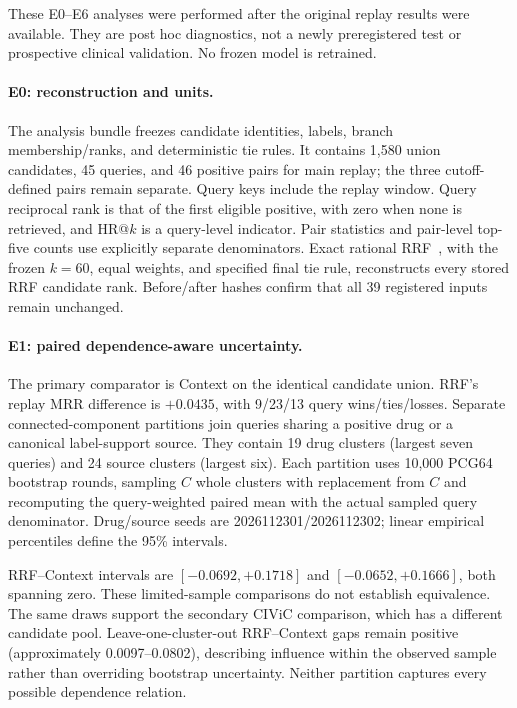 \documentclass[runningheads]{llncs}
\begin{document}
These E0--E6 analyses were performed after the original replay results were available. They are post hoc diagnostics, not a newly preregistered test or prospective clinical validation. No frozen model is retrained.

\paragraph{E0: reconstruction and units.}
The analysis bundle freezes candidate identities, labels, branch membership/ranks, and deterministic tie rules. It contains 1,580 union candidates, 45 queries, and 46 positive pairs for main replay; the three cutoff-defined pairs remain separate. Query keys include the replay window. Query reciprocal rank is that of the first eligible positive, with zero when none is retrieved, and HR@\(k\) is a query-level indicator. Pair statistics and pair-level top-five counts use explicitly separate denominators. Exact rational RRF~\cite{rrf}, with the frozen \(k=60\), equal weights, and specified final tie rule, reconstructs every stored RRF candidate rank. Before/after hashes confirm that all 39 registered inputs remain unchanged.

\paragraph{E1: paired dependence-aware uncertainty.}
The primary comparator is Context on the identical candidate union. RRF's replay MRR difference is \(+0.0435\), with 9/23/13 query wins/ties/losses. Separate connected-component partitions join queries sharing a positive drug or a canonical label-support source. They contain 19 drug clusters (largest seven queries) and 24 source clusters (largest six). Each partition uses 10,000 PCG64 bootstrap rounds, sampling \(C\) whole clusters with replacement from \(C\) and recomputing the query-weighted paired mean with the actual sampled query denominator. Drug/source seeds are 2026112301/2026112302; linear empirical percentiles define the 95\% intervals.

RRF--Context intervals are \([-0.0692,+0.1718]\) and \([-0.0652,+0.1666]\), both spanning zero. These limited-sample comparisons do not establish equivalence. The same draws support the secondary CIViC comparison, which has a different candidate pool. Leave-one-cluster-out RRF--Context gaps remain positive (approximately 0.0097--0.0802), describing influence within the observed sample rather than overriding bootstrap uncertainty. Neither partition captures every possible dependence relation.
\end{document}
